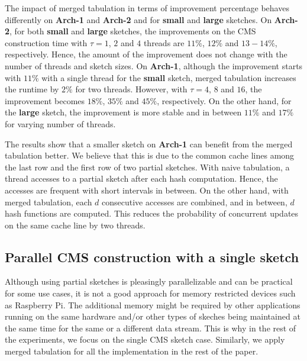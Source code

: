 \documentclass[10pt, conference, compsocconf]{IEEEtran}
\begin{document}
The impact of merged tabulation in terms of improvement percentage behaves differently on {\bf Arch-1} and {\bf Arch-2} and for {\bf small} and {\bf large} sketches. On {\bf Arch-2}, for both {\bf small} and {\bf large} sketches, the improvements on the CMS construction time with $\tau = 1$, $2$ and $4$ threads are $11\%$, $12\%$ and $13-14\%$, respectively. Hence, the amount of the improvement does not change with the number of threads and sketch sizes. On {\bf Arch-1}, although the improvement starts with $11\%$ with a single thread for the  {\bf small} sketch, merged tabulation increases the runtime by $2\%$ for two threads. However, with $\tau = 4$, $8$ and $16$, the improvement becomes $18\%$, $35\%$ and $45\%$, respectively. On the other hand, for the {\bf large} sketch, the improvement is more stable and in between $11\%$ and $17\%$ for varying number of threads. 

The results show that a smaller sketch on {\bf Arch-1} can benefit from the merged tabulation better. We believe that this is due to the common cache lines among the last row and the first row of two partial sketches. With naive tabulation, a thread accesses to a partial sketch after each hash computation. Hence, the accesses are frequent  with short intervals in between. On the other hand, with merged tabulation, each $d$ consecutive accesses are combined, and in between, $d$ hash functions are computed. This reduces the probability of concurrent updates on the same cache line by two threads.  

\subsection{Parallel CMS construction with a single sketch}

Although using partial sketches is pleasingly parallelizable and can be practical for some use cases, it is not a good approach for memory restricted devices such as Raspberry Pi. The additional memory might be required by other applications running on the same hardware and/or other types of skeches being maintained at the same time for the same or a different data stream. This is why in the rest of the experiments, we focus on the single CMS sketch case. Similarly, we apply merged tabulation for all the implementation in the rest of the paper.  
\end{document}
